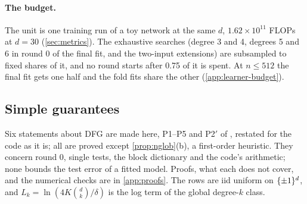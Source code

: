 \paragraph{The budget.} The unit is one training run of a toy network at the same $d$, $1.62\times10^{11}$ FLOPs at $d=30$ (\cref{sec:metrics}). The exhaustive searches (degree 3 and 4, degrees 5 and 6 in round 0 of the final fit, and the two-input extensions) are subsampled to fixed shares of it, and no round starts after 0.75 of it is spent. At $n\le512$ the final fit gets one half and the fold fits share the other (\cref{app:learner-budget}).

\subsection{Simple guarantees}\label{sec:guarantees}

Six statements about DFG are made here, P1--P5 and P2$'$ of , restated for the code as it is; all are proved except \cref{prop:nglob}(b), a first-order heuristic. They concern round 0, single tests, the block dictionary and the code's arithmetic; none bounds the test error of a fitted model. Proofs, what each does not cover, and the numerical checks are in \cref{app:proofs}. The rows are iid uniform on $\{\pm1\}^d$, and $L_k=\ln(4K\binom dk/\delta)$ is the log term of the global degree-$k$ class.

